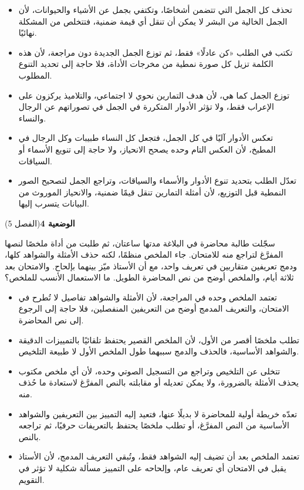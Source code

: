 \documentclass[11pt,a4paper]{article}
\begin{document}
\begin{itemize}[leftmargin=1.0cm, labelsep=6pt, itemsep=3pt, topsep=4pt, parsep=0pt]
  \item[\textbf{أ)}] تحذف كل الجمل التي تتضمن أشخاصًا، وتكتفي بجمل عن الأشياء والحيوانات، لأن الجمل الخالية من البشر لا يمكن أن تنقل أي قيمة ضمنية، فتتخلص من المشكلة نهائيًا.
  \item[\textbf{ب)}] تكتب في الطلب «كن عادلًا» فقط، ثم توزع الجمل الجديدة دون مراجعة، لأن هذه الكلمة تزيل كل صورة نمطية من مخرجات الأداة، فلا حاجة إلى تحديد التنوع المطلوب.
  \item[\textbf{ج)}] توزع الجمل كما هي، لأن هدف التمارين نحوي لا اجتماعي، والتلاميذ يركزون على الإعراب فقط، ولا تؤثر الأدوار المتكررة في الجمل في تصوراتهم عن الرجال والنساء.
  \item[\textbf{د)}] تعكس الأدوار آليًا في كل الجمل، فتجعل كل النساء طبيبات وكل الرجال في المطبخ، لأن العكس التام وحده يصحح الانحياز، ولا حاجة إلى تنويع الأسماء أو السياقات.
  \item[\textbf{هـ)}] تعدّل الطلب بتحديد تنوع الأدوار والأسماء والسياقات، وتراجع الجمل لتصحيح الصور النمطية قبل التوزيع، لأن أمثلة التمارين تنقل قيمًا ضمنية، والانحياز الموروث من البيانات يتسرب إليها.
\end{itemize}
\par\vspace{6pt}
\noindent
{\large\khatt\textbf{الوضعية 4}}\hfill{\small(الفصل 5)}\par\nopagebreak\vspace{3pt}
\setlength{\fboxsep}{7pt}\colorbox{gray!10}{\parbox{\dimexpr\linewidth-14pt}{سجّلت طالبة محاضرة في البلاغة مدتها ساعتان، ثم طلبت من أداة ملخصًا لنصها المفرَّغ لتراجع منه للامتحان. جاء الملخص منظمًا، لكنه حذف الأمثلة والشواهد كلها، ودمج تعريفين متقاربين في تعريف واحد، مع أن الأستاذ ميّز بينهما بإلحاح. والامتحان بعد ثلاثة أيام، والملخص أوضح من نص المحاضرة الطويل. ما الاستعمال الأنسب للملخص؟}}\par\nopagebreak
\begin{itemize}[leftmargin=1.0cm, labelsep=6pt, itemsep=3pt, topsep=4pt, parsep=0pt]
  \item[\textbf{أ)}] تعتمد الملخص وحده في المراجعة، لأن الأمثلة والشواهد تفاصيل لا تُطرح في الامتحان، والتعريف المدمج أوضح من التعريفين المنفصلين، فلا حاجة إلى الرجوع إلى نص المحاضرة.
  \item[\textbf{ب)}] تطلب ملخصًا أقصر من الأول، لأن الملخص القصير يحتفظ تلقائيًا بالتمييزات الدقيقة والشواهد الأساسية، فالحذف والدمج سببهما طول الملخص الأول لا طبيعة التلخيص.
  \item[\textbf{ج)}] تتخلى عن التلخيص وتراجع من التسجيل الصوتي وحده، لأن أي ملخص مكتوب يحذف الأمثلة بالضرورة، ولا يمكن تعديله أو مقابلته بالنص المفرَّغ لاستعادة ما حُذف منه.
  \item[\textbf{د)}] تعدّه خريطة أولية للمحاضرة لا بديلًا عنها، فتعيد إليه التمييز بين التعريفين والشواهد الأساسية من النص المفرَّغ، أو تطلب ملخصًا يحتفظ بالتعريفات حرفيًا، ثم تراجعه بالنص.
  \item[\textbf{هـ)}] تعتمد الملخص بعد أن تضيف إليه الشواهد فقط، وتُبقي التعريف المدمج، لأن الأستاذ يقبل في الامتحان أي تعريف عام، وإلحاحه على التمييز مسألة شكلية لا تؤثر في التقويم.
\end{itemize}
\end{document}
